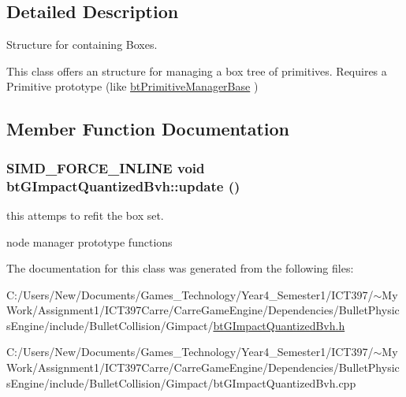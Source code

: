 \subsection{Detailed Description}
Structure for containing Boxes. 

This class offers an structure for managing a box tree of primitives. Requires a Primitive prototype (like \hyperlink{classbt_primitive_manager_base}{btPrimitiveManagerBase} ) 

\subsection{Member Function Documentation}
\hypertarget{classbt_g_impact_quantized_bvh_71665f5245b8f7de1c54f107ef262cd0}{
\subsubsection[update]{\setlength{\rightskip}{0pt plus 5cm}SIMD\_\-FORCE\_\-INLINE void btGImpactQuantizedBvh::update ()}}
\label{classbt_g_impact_quantized_bvh_71665f5245b8f7de1c54f107ef262cd0}


this attemps to refit the box set. 

node manager prototype functions 

The documentation for this class was generated from the following files:\begin{CompactItemize}
\item 
C:/Users/New/Documents/Games\_\-Technology/Year4\_\-Semester1/ICT397/$\sim$My Work/Assignment1/ICT397Carre/CarreGameEngine/Dependencies/BulletPhysicsEngine/include/BulletCollision/Gimpact/\hyperlink{bt_g_impact_quantized_bvh_8h}{btGImpactQuantizedBvh.h}\item 
C:/Users/New/Documents/Games\_\-Technology/Year4\_\-Semester1/ICT397/$\sim$My Work/Assignment1/ICT397Carre/CarreGameEngine/Dependencies/BulletPhysicsEngine/include/BulletCollision/Gimpact/btGImpactQuantizedBvh.cpp\end{CompactItemize}
